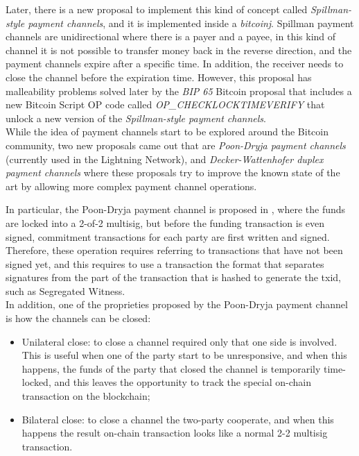 Later, there is a new proposal to implement this kind of concept called \emph{Spillman-style payment channels}, and it is
implemented inside a \emph{bitcoinj}\cite{bitcoinj-impl}. Spillman payment channels are unidirectional where
there is a payer and a payee, in this kind of channel it is not possible to transfer money back in the reverse direction, and the payment
channels expire after a specific time.
In addition, the receiver needs to close the channel before the expiration time.
However, this proposal has malleability problems solved later by the \emph{BIP  65}\cite{bip65} Bitcoin proposal that includes a new Bitcoin Script OP code
called \emph{OP\_CHECKLOCKTIMEVERIFY} that unlock a new version of the \emph{Spillman-style payment channels}.\\
While the idea of payment channels start to be explored around the Bitcoin community, two new proposals came out that are
\emph{Poon-Dryja payment channels}\cite{lightning-network-paper} (currently used in the Lightning Network),
and \emph{Decker-Wattenhofer duplex payment channels}\cite{Decker2015fast} where these proposals try to improve the known state
of the art by allowing more complex payment channel operations.

In particular, the Poon-Dryja payment channel is proposed in \cite{lightning-network-paper}, where
the funds are locked into a 2-of-2 multisig\cite{Palazzo_Estrazione_di_Informazioni_2019},
but before the funding transaction is even signed, commitment transactions for each party are first written and signed.
Therefore, these operation requires referring to transactions that have not been signed yet, and this requires to use a transaction
the format that separates signatures from the part of the transaction that is hashed to generate the txid, such as Segregated Witness\cite{Palazzo_Estrazione_di_Informazioni_2019}.\\
In addition, one of the proprieties proposed by the Poon-Dryja payment channel is how the channels can be closed:

\begin{itemize}
  \item Unilateral close: to close a channel required only that one side is involved. This is useful when one
        of the party start to be unresponsive, and when this happens, the funds of
        the party that closed the channel is temporarily time-locked, and this leaves the opportunity to
        track the special on-chain transaction on the blockchain;
  \item Bilateral close: to close a channel the two-party cooperate, and when this happens the result
        on-chain transaction looks like a normal 2-2 multisig transaction.
\end{itemize}

